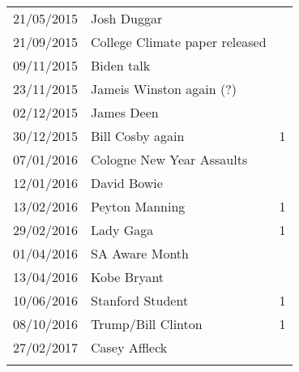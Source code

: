 {\begin{tabular}{llr}
21/05/2015 & Josh Duggar                           &            \\
21/09/2015 & College Climate paper released        &            \\
09/11/2015 & Biden talk                            &            \\
23/11/2015 & Jameis Winston again (?)              &            \\
02/12/2015 & James Deen                            &            \\
30/12/2015 & Bill Cosby again                      & 1          \\
07/01/2016 & Cologne New Year Assaults             &            \\
12/01/2016 & David Bowie                           &            \\
13/02/2016 & Peyton Manning                        & 1          \\
29/02/2016 & Lady Gaga                             & 1          \\
01/04/2016 & SA Aware Month                        &            \\
13/04/2016 & Kobe Bryant                           &            \\
10/06/2016 & Stanford Student                      & 1          \\
08/10/2016 & Trump/Bill Clinton                    & 1          \\
27/02/2017 & Casey Affleck                         &           \\
\hline\hline \\
\end{tabular}
}